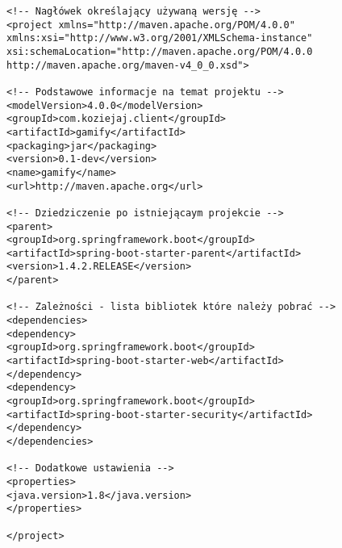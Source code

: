 \documentclass[a4paper,12pt,twoside,openany]{report}
\begin{document}
\begin{lstlisting}
<!-- Nagłówek określający używaną wersję -->
<project xmlns="http://maven.apache.org/POM/4.0.0" xmlns:xsi="http://www.w3.org/2001/XMLSchema-instance"
xsi:schemaLocation="http://maven.apache.org/POM/4.0.0 http://maven.apache.org/maven-v4_0_0.xsd">

<!-- Podstawowe informacje na temat projektu -->
<modelVersion>4.0.0</modelVersion>
<groupId>com.koziejaj.client</groupId>
<artifactId>gamify</artifactId>
<packaging>jar</packaging>
<version>0.1-dev</version>
<name>gamify</name>
<url>http://maven.apache.org</url>

<!-- Dziedziczenie po istniejącaym projekcie -->
<parent>
<groupId>org.springframework.boot</groupId>
<artifactId>spring-boot-starter-parent</artifactId>
<version>1.4.2.RELEASE</version>
</parent>

<!-- Zależności - lista bibliotek które należy pobrać -->
<dependencies>
<dependency>
<groupId>org.springframework.boot</groupId>
<artifactId>spring-boot-starter-web</artifactId>
</dependency>
<dependency>
<groupId>org.springframework.boot</groupId>
<artifactId>spring-boot-starter-security</artifactId>
</dependency>
</dependencies>

<!-- Dodatkowe ustawienia -->
<properties>
<java.version>1.8</java.version>
</properties>

</project>

\end{lstlisting}
\end{document}
